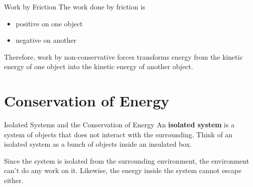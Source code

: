 \documentclass[12pt,compress,aspectratio=169]{beamer}
\begin{document}
\begin{frame}{Work by Friction}
  The work done by friction is
  \begin{itemize}
  \item positive on one object
  \item negative on another
  \end{itemize}
  Therefore, work by non-conservative forces transforms energy from the kinetic
  energy of one object into the kinetic energy of another object.
\end{frame}



\section{Conservation of Energy}

\begin{frame}{Isolated Systems and the Conservation of Energy}
  An \textbf{isolated system} is a system of objects that does not interact with
  the surrounding. Think of an isolated system as a bunch of objects inside an
  insulated box.
  \begin{center}
  \end{center}
  Since the system is isolated from the surrounding environment, the
  environment can't do any work on it. Likewise, the energy inside the system
  cannot escape either.
\end{frame}
\end{document}
